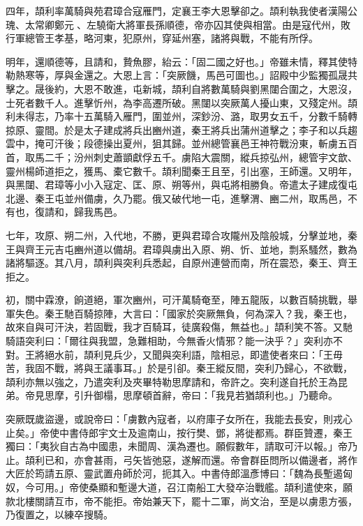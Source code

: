 \begin{pinyinscope}
 四年，頡利率萬騎與苑君璋合寇雁門，定襄王李大恩擊卻之。頡利執我使者漢陽公瑰、太常卿鄭元、左驍衛大將軍長孫順德，帝亦囚其使與相當。由是寇代州，敗行軍總管王孝基，略河東，犯原州，穿延州塞，諸將與戰，不能有所俘。



 明年，還順德等，且請和，贄魚膠，紿云：「固二國之好也。」帝雖未情，釋其使特勒熱寒等，厚與金還之。大恩上言：「突厥饑，馬邑可圖也。」詔殿中少監獨孤晟共擊之。晟後約，大恩不敢進，屯新城，頡利自將數萬騎與劉黑闥合圍之，大恩沒，士死者數千人。進擊忻州，為李高遷所破。黑闥以突厥萬人擾山東，又殘定州。頡利未得志，乃率十五萬騎入雁門，圍並州，深鈔汾、潞，取男女五千，分數千騎轉掠原、靈間。於是太子建成將兵出豳州道，秦王將兵出蒲州道擊之；李子和以兵趨雲中，掩可汗後；段德操出夏州，狙其歸。並州總管襄邑王神符戰汾東，斬虜五百首，取馬二千；汾州刺史蕭顗獻俘五千。虜陷大震關，縱兵掠弘州，總管宇文歆、靈州楊師道拒之，獲馬、橐它數千。頡利聞秦王且至，引出塞，王師還。又明年，與黑闥、君璋等小小入寇定、匡、原、朔等州，與屯將相勝負。帝遣太子建成復屯北邊、秦王屯並州備虜，久乃罷。俄又破代地一屯，進擊渭、豳二州，取馬邑，不有也，復請和，歸我馬邑。



 七年，攻原、朔二州，入代地，不勝，更與君璋合攻隴州及陰般城，分擊並地，秦王與齊王元吉屯豳州道以備胡。君璋與虜出入原、朔、忻、並地，剽系騷然，數為諸將驅逐。其八月，頡利與突利兵悉起，自原州連營而南，所在震恐，秦王、齊王拒之。



 初，關中霖潦，餉道絕，軍次豳州，可汗萬騎奄至，陣五龍阪，以數百騎挑戰，舉軍失色。秦王馳百騎掠陣，大言曰：「國家於突厥無負，何為深入？我，秦王也，故來自與可汗決，若固戰，我才百騎耳，徒廣殺傷，無益也。」頡利笑不答。又馳騎語突利曰：「爾往與我盟，急難相助，今無香火情邪？能一決乎？」突利亦不對。王將絕水前，頡利見兵少，又聞與突利語，陰相忌，即遣使者來曰：「王毋苦，我固不戰，將與王議事耳。」於是引卻。秦王縱反間，突利乃歸心，不欲戰，頡利亦無以強之，乃遣突利及夾畢特勒思摩請和，帝許之。突利遂自托於王為昆弟。帝見思摩，引升御榻，思摩頓首辭，帝曰：「我見若猶頡利也。」乃聽命。



 突厥既歲盜邊，或說帝曰：「虜數內寇者，以府庫子女所在，我能去長安，則戎心止矣。」帝使中書侍郎宇文士及逾南山，按行樊、鄧，將徙都焉。群臣贊遷，秦王獨曰：「夷狄自古為中國患，未聞周、漢為遷也。願假數年，請取可汗以報。」帝乃止。頡利已和，亦會甚雨，弓矢皆弛惡，遂解而還。帝會群臣問所以備邊者，將作大匠於筠請五原、靈武置舟師於河，扼其入。中書侍郎溫彥博曰：「魏為長塹遏匈奴，今可用。」帝使桑顯和塹邊大道，召江南船工大發卒治戰艦。頡利遣使來，願款北樓關請互市，帝不能拒。帝始兼天下，罷十二軍，尚文治，至是以虜患方張，乃復置之，以練卒搜騎。




\end{pinyinscope}
